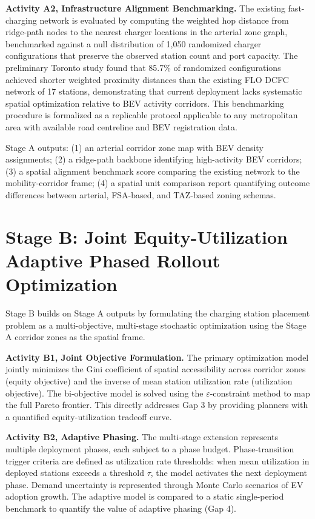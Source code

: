 \documentclass[letterpaper, 12pt, oneside, doublespacing]{Thesis}
\begin{document}
\noindent \textbf{Activity A2, Infrastructure Alignment Benchmarking.} The existing fast-charging network is evaluated by computing the weighted hop distance from ridge-path nodes to the nearest charger locations in the arterial zone graph, benchmarked against a null distribution of 1,050 randomized charger configurations that preserve the observed station count and port capacity. The preliminary Toronto study found that 85.7\% of randomized configurations achieved shorter weighted proximity distances than the existing FLO DCFC network of 17 stations, demonstrating that current deployment lacks systematic spatial optimization relative to BEV activity corridors. This benchmarking procedure is formalized as a replicable protocol applicable to any metropolitan area with available road centreline and BEV registration data.


Stage A outputs: (1) an arterial corridor zone map with BEV density assignments; (2) a ridge-path backbone identifying high-activity BEV corridors; (3) a spatial alignment benchmark score comparing the existing network to the mobility-corridor frame; (4) a spatial unit comparison report quantifying outcome differences between arterial, FSA-based, and TAZ-based zoning schemas.

\section{Stage B: Joint Equity-Utilization Adaptive Phased Rollout Optimization}

Stage B builds on Stage A outputs by formulating the charging station placement problem as a multi-objective, multi-stage stochastic optimization using the Stage A corridor zones as the spatial frame.


\noindent \textbf{Activity B1, Joint Objective Formulation.} The primary optimization model jointly minimizes the Gini coefficient of spatial accessibility across corridor zones (equity objective) and the inverse of mean station utilization rate (utilization objective). The bi-objective model is solved using the $\varepsilon$-constraint method to map the full Pareto frontier. This directly addresses Gap 3 by providing planners with a quantified equity-utilization tradeoff curve.



\noindent \textbf{Activity B2, Adaptive Phasing.} The multi-stage extension represents multiple deployment phases, each subject to a phase budget. Phase-transition trigger criteria are defined as utilization rate thresholds: when mean utilization in deployed stations exceeds a threshold $\tau$, the model activates the next deployment phase. Demand uncertainty is represented through Monte Carlo scenarios of EV adoption growth. The adaptive model is compared to a static single-period benchmark to quantify the value of adaptive phasing (Gap 4).
\end{document}
